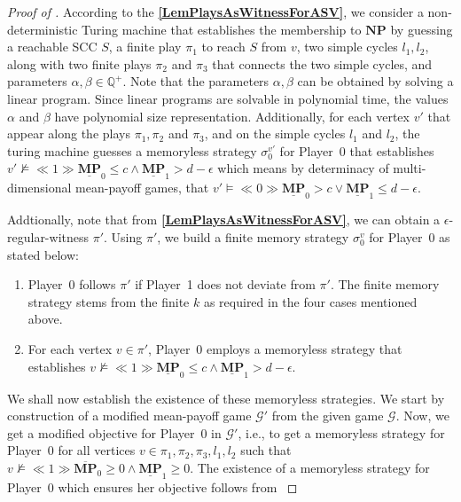 \begin{proof}[Proof of \textbf{}]
According to the \textbf{\cref{LemPlaysAsWitnessForASV}}, we consider a non-deterministic Turing machine that establishes the membership to $\mathbf{NP}$ by guessing a reachable SCC $S$, a finite play $\pi_1$ to reach $S$ from $v$, two simple cycles $l_1, l_2$, along with two finite plays $\pi_2$ and $\pi_3$ that connects the two simple cycles, and parameters $\alpha, \beta \in \mathbb{Q}^{+}$. Note that the parameters $\alpha , \beta$ can be obtained by solving a linear program. Since linear programs are solvable in polynomial time, the values $\alpha$ and $\beta$ have polynomial size representation. Additionally, for each vertex $v'$ that appear along the plays $\pi_1, \pi_2$ and $\pi_3$, and on the simple cycles $l_1$ and $l_2$, the turing machine guesses a memoryless strategy $\sigma_0^{v'}$ for Player~0 that establishes $v' \nvDash \ll 1 \gg \underline{\textbf{MP}}_0 \leqslant c \land \underline{\textbf{MP}}_1 > d - \epsilon$ which means by determinacy of multi-dimensional mean-payoff games, that $v' \models \ll 0 \gg \underline{\textbf{MP}}_0 > c \lor \underline{\textbf{MP}}_1 \leqslant d - \epsilon$.

Addtionally, note that from \textbf{\cref{LemPlaysAsWitnessForASV}}, we can obtain a $\epsilon$-regular-witness $\pi'$. Using $\pi'$, we build a finite memory strategy $\sigma_0^v$ for Player~0 as stated below:
\begin{enumerate}
    \item Player~0 follows $\pi'$ if Player~1 does not deviate from $\pi'$. The finite memory strategy stems from the finite $k$ as required in the four cases mentioned above.
    \item For each vertex $v \in \pi'$, Player~0 employs a memoryless strategy that establishes $v \nvDash \ll 1 \gg \underline{\mathbf{MP}}_0 \leqslant c \land \underline{\mathbf{MP}}_1 > d-\epsilon$.
\end{enumerate}

We shall now establish the existence of these memoryless strategies. 
We start by construction of a modified mean-payoff game $\mathcal{G'}$ from the given game $\mathcal{G}$. Now, we get a modified objective for Player~0 in $\mathcal{G'}$, i.e., to get a memoryless strategy for Player~0 for all vertices $v \in \pi_1, \pi_2, \pi_3, l_1, l_2$ such that $v \nvDash \ll 1 \gg \overline{\mathbf{MP}}_0 \geqslant 0 \land \underline{\mathbf{MP}}_1 \geqslant 0$. The existence of a memoryless strategy for Player~0 which ensures her objective follows from \textbf{}


\end{proof}
